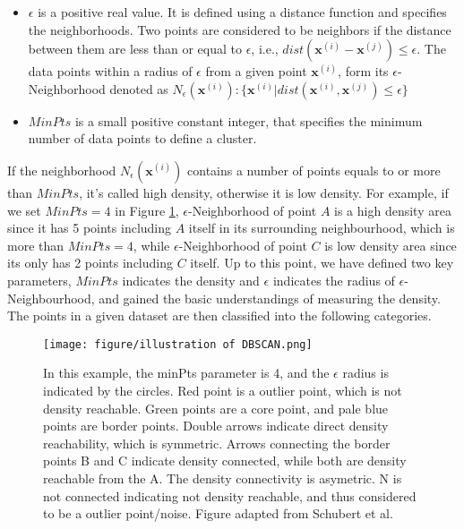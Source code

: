 \begin{itemize}
	\item{$\epsilon$} is a positive real value. It is defined using a distance 
	function and specifies the neighborhoods. Two points are considered to be 
	neighbors if the distance between them are less than or equal to 
	$\epsilon$, i.e., $dist(\mathbf{x}^{(i)} - \mathbf{x}^{(j)}) \leq \epsilon$. The data 
	points within a radius of $\epsilon$ from a given point $\mathbf{x}^{(i)}$, 
	form its $\epsilon$-Neighborhood denoted as 
	$\mathit{N_{\epsilon}(\mathbf{x}^{(i)}):\{\mathbf{x}^{(i)}| 
	dist(\mathbf{x}^{(i)}, \mathbf{x}^{(j)})\leq \epsilon\}}$
	
	\item{$MinPts$} is a small positive constant integer, that specifies the 
	minimum number of data points to define a cluster.	
\end{itemize}

If the neighborhood $N_{\epsilon}(\mathbf{x}^{(i)})$ contains a number of points equals to or more than $MinPts$, it's called high density, otherwise it is low density. For example, 
if we set $MinPts = 4$ in Figure \ref{fig:relation}, 
$\epsilon$-Neighborhood of point $A$ is a high density area since it has 5 
points including $A$ itself in its surrounding neighbourhood, which is more 
than $MinPts = 4$, while $\epsilon$-Neighborhood of point $C$ is low density 
area since its only has 2 points including $C$ itself. Up to this point, we have defined two key parameters, $MinPts$ indicates the  density and $\epsilon$ indicates the radius of $\epsilon$-Neighbourhood, and  gained the 
basic understandings of measuring the density. The points in a given dataset 
are then classified into the following categories. 


\begin{figure}[tbp]
	\centering
	\texttt{[image: figure/illustration of 
		DBSCAN.png]}
	\caption{In this example, the minPts parameter is 4, and the $\epsilon$ 
		radius is indicated by the circles. Red point is a outlier point, which 
		is 
		not density reachable. Green points are a core point, and pale blue 
		points 
		are border points. Double arrows indicate direct density reachability, 
		which is symmetric. Arrows connecting the border points B and C 
		indicate 
		density connected, while both are density reachable from the A. The 
		density 
		connectivity is asymetric. N is not connected indicating not density 
		reachable, and thus considered to be a outlier point/noise. Figure adapted from 
		Schubert et al. 
		\cite{schubert2017dbscan}
	}
	\label{fig:relation}
\end{figure}



